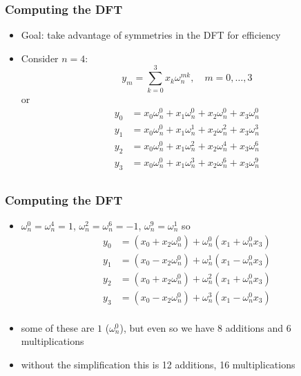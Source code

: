\documentclass[10pt]{beamer}
\begin{document}
\begin{frame}
\frametitle{Computing the DFT}
\begin{itemize}
  \item Goal: take advantage of symmetries in the DFT for efficiency
  \item Consider $n=4$:
\[
y_m = \sum_{k=0}^3 x_k \omega_n^{mk}, \quad m=0,\dots,3
\]
or
\begin{align*}
  y_0 & = x_0 \omega_n^0 + x_1 \omega_n^0 + x_2 \omega_n^0 + x_3 \omega_n^0\\
  y_1 & = x_0 \omega_n^0 + x_1 \omega_n^1 + x_2 \omega_n^2 + x_3 \omega_n^3\\
  y_2 & = x_0 \omega_n^0 + x_1 \omega_n^2 + x_2 \omega_n^4 + x_3 \omega_n^6\\
  y_3 & = x_0 \omega_n^0 + x_1 \omega_n^3 + x_2 \omega_n^6 + x_3 \omega_n^9\\
\end{align*}
\end{itemize}
\end{frame}
\begin{frame}
\frametitle{Computing the DFT}
\begin{itemize}
  \item $\omega_n^0=\omega_n^4 = 1$, $\omega_n^2=\omega_n^6 = -1$,
$\omega_n^9=\omega_n^1$ so
\begin{align*}
  y_0 & = (x_0 + x_2 \omega_n^0) + \omega_n^0 (x_1 + \omega_n^0 x_3)\\
  y_1 & = (x_0 - x_2 \omega_n^0) + \omega_n^1 (x_1 - \omega_n^0 x_3)\\
  y_2 & = (x_0 + x_2 \omega_n^0) + \omega_n^2 (x_1 + \omega_n^0 x_3)\\
  y_3 & = (x_0 - x_2 \omega_n^0) + \omega_n^3 (x_1 - \omega_n^0 x_3)\\
\end{align*}
  \item some of these are $1$ ($\omega_n^0$), but even so we have 8 additions
and 6 multiplications
  \item without the simplification this is 12 additions, 16 multiplications
\end{itemize}
\end{frame}
\end{document}
